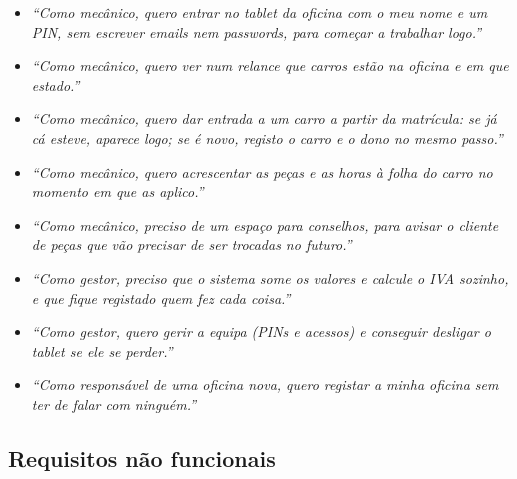 \documentclass[a4paper,12pt]{article}
\begin{document}
\begin{itemize}
    \item \textit{``Como mecânico, quero entrar no tablet da oficina com o meu nome e um PIN, sem escrever emails nem passwords, para começar a trabalhar logo.''}
    \item \textit{``Como mecânico, quero ver num relance que carros estão na oficina e em que estado.''}
    \item \textit{``Como mecânico, quero dar entrada a um carro a partir da matrícula: se já cá esteve, aparece logo; se é novo, registo o carro e o dono no mesmo passo.''}
    \item \textit{``Como mecânico, quero acrescentar as peças e as horas à folha do carro no momento em que as aplico.''}
    \item \textit{``Como mecânico, preciso de um espaço para conselhos, para avisar o cliente de peças que vão precisar de ser trocadas no futuro.''}
    \item \textit{``Como gestor, preciso que o sistema some os valores e calcule o IVA sozinho, e que fique registado quem fez cada coisa.''}
    \item \textit{``Como gestor, quero gerir a equipa (PINs e acessos) e conseguir desligar o tablet se ele se perder.''}
    \item \textit{``Como responsável de uma oficina nova, quero registar a minha oficina sem ter de falar com ninguém.''}
\end{itemize}

\subsection{Requisitos não funcionais}
\end{document}
